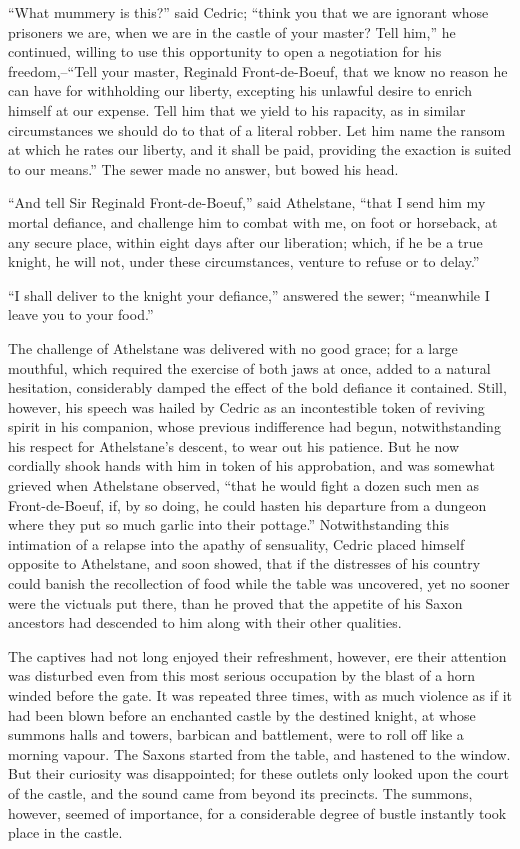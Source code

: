 ``What mummery is this?'' said Cedric; ``think you that we are ignorant
whose prisoners we are, when we are in the castle of your master? Tell
him,'' he continued, willing to use this opportunity to open a
negotiation for his freedom,--``Tell your master, Reginald
Front-de-Boeuf, that we know no reason he can have for withholding our
liberty, excepting his unlawful desire to enrich himself at our expense.
Tell him that we yield to his rapacity, as in similar circumstances we
should do to that of a literal robber. Let him name the ransom at which
he rates our liberty, and it shall be paid, providing the exaction is
suited to our means.'' The sewer made no answer, but bowed his head.

``And tell Sir Reginald Front-de-Boeuf,'' said Athelstane, ``that I send
him my mortal defiance, and challenge him to combat with me, on foot or
horseback, at any secure place, within eight days after our liberation;
which, if he be a true knight, he will not, under these circumstances,
venture to refuse or to delay.''

``I shall deliver to the knight your defiance,'' answered the sewer;
``meanwhile I leave you to your food.''

The challenge of Athelstane was delivered with no good grace; for a
large mouthful, which required the exercise of both jaws at once, added
to a natural hesitation, considerably damped the effect of the bold
defiance it contained. Still, however, his speech was hailed by Cedric
as an incontestible token of reviving spirit in his companion, whose
previous indifference had begun, notwithstanding his respect for
Athelstane's descent, to wear out his patience. But he now cordially
shook hands with him in token of his approbation, and was somewhat
grieved when Athelstane observed, ``that he would fight a dozen such men
as Front-de-Boeuf, if, by so doing, he could hasten his departure from a
dungeon where they put so much garlic into their pottage.''
Notwithstanding this intimation of a relapse into the apathy of
sensuality, Cedric placed himself opposite to Athelstane, and soon
showed, that if the distresses of his country could banish the
recollection of food while the table was uncovered, yet no sooner were
the victuals put there, than he proved that the appetite of his Saxon
ancestors had descended to him along with their other qualities.

The captives had not long enjoyed their refreshment, however, ere their
attention was disturbed even from this most serious occupation by the
blast of a horn winded before the gate. It was repeated three times,
with as much violence as if it had been blown before an enchanted castle
by the destined knight, at whose summons halls and towers, barbican and
battlement, were to roll off like a morning vapour. The Saxons started
from the table, and hastened to the window. But their curiosity was
disappointed; for these outlets only looked upon the court of the
castle, and the sound came from beyond its precincts. The summons,
however, seemed of importance, for a considerable degree of bustle
instantly took place in the castle.
